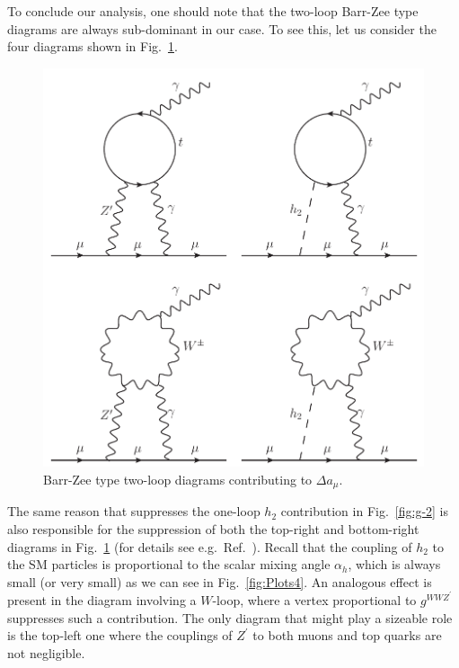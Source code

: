 \documentclass[a4paper,11pt]{article}
\renewcommand{\(}{\left(}
\renewcommand{\)}{\right)}
\renewcommand{\[}{\left[}
\renewcommand{\]}{\right]}
\begin{document}
To conclude our analysis, one should note that the two-loop Barr-Zee type diagrams \cite{Barr:1990vd} are always sub-dominant in our case. To see this, let us consider the four diagrams shown in Fig.~\ref{fig:Barr-Zee}.
\begin{figure}[!htb]
	\centering
	\includegraphics[scale=0.6]{Barr-Zee.pdf}
	\caption{Barr-Zee type two-loop diagrams contributing to $\Delta a_\mu$.}
	\label{fig:Barr-Zee}
\end{figure}	
The same reason that suppresses the one-loop $h_2$ contribution in Fig.~\ref{fig:g-2} is also responsible for the suppression of both the top-right and bottom-right diagrams in Fig.~\ref{fig:Barr-Zee} (for details see e.g.~Ref.~\cite{Ilisie:2015tra}). Recall that the coupling of $h_2$ to the SM particles is proportional to the scalar mixing angle $\alpha_h$, which is always small (or very small) as we can see in Fig.~\ref{fig:Plots4}. An analogous effect is present in the diagram involving a $W$-loop, where a vertex proportional to $g^{WWZ^\prime}$ suppresses such a contribution. The only diagram that might play a sizeable role is the top-left one where the couplings of $Z^\prime$ to both muons and top quarks are not negligible.
\end{document}
